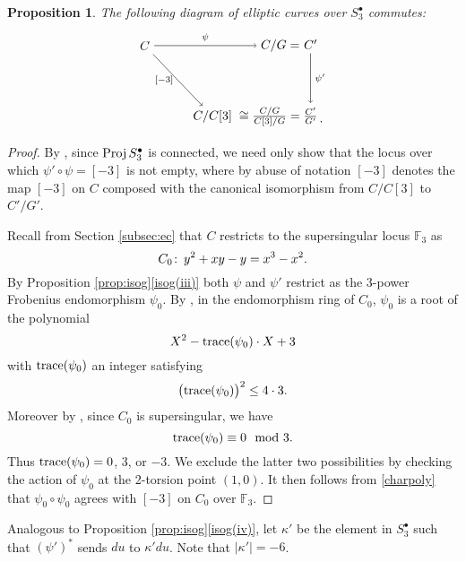 \documentclass{gtpart}
\newtheorem{prop}[thm]{Proposition}
\theoremstyle{definition}
\theoremstyle{remark}
\def\co{\colon\thinspace}
\newcommand{\mb}[1]{\mathbb{#1}}
\newcommand{\Proj}{{\rm Proj\thinspace}}
\newcommand{\BF}{{\mb F}}
\newcommand{\md}{~~{\rm mod}~}
\newcommand{\K}{\kappa}
\newcommand{\s}{S^\bullet}
\newcommand{\isog}[1]{Proposition \ref{prop:isog}\thinspace \eqref{isog(#1)}}
\begin{document}
\begin{prop}
\label{prop:frob^2}
 The following diagram of elliptic curves over $\s_3$ commutes: 
 \begin{equation}
 \label{frob^2}
  \begin{tikzpicture}[baseline=(current bounding box.center)]
          \node (LT) at (0, 2) {$C$}; 
          \node (MT) at (3.8, 2) {$C/G = $}; 
          \node (RT) at (4.65, 2.04) {$C'$}; 
          \node (LB) at (1.9, 0) {$C/C[3]$}; 
          \node (MB) at (3.5, 0) {$\cong \frac{C/G}{C[3]/G} = $}; 
          \node (RB) at (4.65, 0.025) {$\frac{C'}{G'}$}; 
          \node at (4.95, -0.15) {.}; 
          \draw [->] (LT) -- node [above] {$\scriptstyle \psi$} (MT); 
          \draw [->] (LT) -- node [left] {$\scriptstyle [-3]$} (LB); 
          \draw [->] (RT) -- node [right] {$\scriptstyle \psi'$} (RB); 
  \end{tikzpicture}
 \end{equation}
\end{prop}
\begin{proof}
 By \cite[2.4.2]{KM}, since $\Proj \s_3$ is connected, we need only show that the locus over which $\psi' \circ \psi = [-3]$ is not empty, 
 where by abuse of notation $[-3]$ denotes the map $[-3]$ on $C$ composed with the canonical isomorphism from $C/C[3]$ to $C'/G'$.  

 Recall from Section \ref{subsec:ec} that $C$ restricts to the supersingular locus $\BF_3$ as 
 \[
  C_0 \co y^2 + x y - y = x^3 - x^2.  
 \]
 By \isog{iii} both $\psi$ and $\psi'$ restrict as the 3-power Frobenius endomorphism $\psi_0$.   
 By \cite[2.6.3]{KM}, in the endomorphism ring of $C_0$, $\psi_0$ is a root of the polynomial 
 \begin{equation}
 \label{charpoly}
  X^2 - {\rm trace}(\psi_0) \cdot X + 3 
 \end{equation}
 with ${\rm trace}(\psi_0)$ an integer satisfying 
 \[
  \big( {\rm trace}(\psi_0) \big)^2 \leq 4 \cdot 3.  
 \]
 Moreover by \cite[Exercise 5.10a]{AEC}, since $C_0$ is supersingular, we have 
 \[
  {\rm trace}(\psi_0) \equiv 0 \md 3.  
 \]
 Thus ${\rm trace}(\psi_0) = 0$, 3, or $-3$.  
 We exclude the latter two possibilities by checking the action of $\psi_0$ at the 2-torsion point $(1,0)$.  
 It then follows from \eqref{charpoly} that $\psi_0 \circ \psi_0$ agrees with $[-3]$ on $C_0$ over $\BF_3$.  
\end{proof}

Analogous to \isog{iv}, let $\K'$ be the element in $\s_3$ such that $(\psi')^*$ sends $du$ to $\K' du$.  Note that $|\K'| = -6$.  
\end{document}
